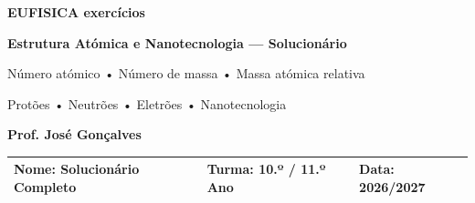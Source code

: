 \documentclass[11pt,a4paper]{article}
\begin{document}
	
	
	\begin{tcolorbox}[
		enhanced,
		colback=eudark,
		colframe=eudark,
		arc=3mm,
		boxrule=0pt,
		left=5mm,
		right=5mm,
		top=5mm,
		bottom=5mm
		]
		\begin{center}
			
			{\Huge\bfseries\color{white} EUFISICA exercícios}
			
			\vspace{2mm}
			
			{\Large\bfseries\color{white}
				Estrutura Atómica e Nanotecnologia --- Solucionário}
			
			\vspace{3mm}
			
			{\large\color{eulightblue}
				Número atómico • Número de massa • Massa atómica relativa}
			
			{\large\color{eulightblue}
				Protões • Neutrões • Eletrões • Nanotecnologia}
			
			\vspace{3mm}
			
			{\color{white}\textbf{Prof. José Gonçalves}}
			
		\end{center}
	\end{tcolorbox}
	
	\vspace{3mm}
	
	\begin{tabularx}{\textwidth}{|X|X|X|}
		\hline
		\textbf{Nome:} Solucionário Completo & \textbf{Turma:} 10.º / 11.º Ano & \textbf{Data:} 2026/2027 \\[2mm]
		\hline
	\end{tabularx}
	
	\vspace{5mm}
	
	
\end{document}
